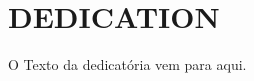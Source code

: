 
{\color{white}
\chapter{DEDICATION}
}


\vspace{3cm}

{\begin{flushright}
	\begin{textit}
{
	O Texto da dedicatória vem para aqui.
	\lipsum[1]	
}
	\end{textit}
\end{flushright}}







